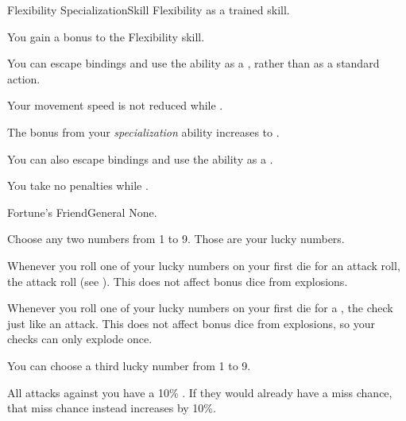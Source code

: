 
  \begin{feat}{Flexibility Specialization}{Skill}
    \featpre Flexibility as a trained skill.

     You gain a  bonus to the Flexibility skill.

     You can escape bindings and use the  ability as a , rather than as a standard action.

     Your movement speed is not reduced while \squeezing.

     The bonus from your \textit{specialization} ability increases to .

     You can also escape bindings and use the  ability as a .

     You take no penalties while \squeezing.
  \end{feat}

  \begin{feat}{Fortune's Friend}{General}
    \featpre None.

     Choose any two numbers from 1 to 9.
    Those are your lucky numbers.

     Whenever you roll one of your lucky numbers on your first die for an attack roll, the attack roll  (see ).
    This does not affect bonus dice from explosions.

     Whenever you roll one of your lucky numbers on your first die for a , the check  just like an attack.
    This does not affect bonus dice from explosions, so your checks can only explode once.

     You can choose a third lucky number from 1 to 9.

     All  attacks against you have a 10\% .
    If they would already have a miss chance, that miss chance instead increases by 10\%.
  \end{feat}


